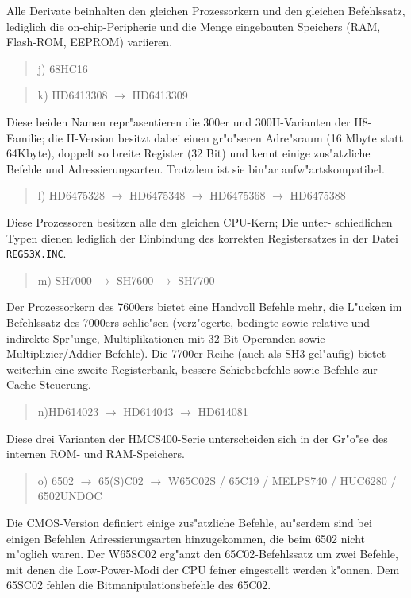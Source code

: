 \documentclass[12pt,a4paper,twoside]{report}
\newcommand{\tty}[1]{{\tt #1}}
\begin{document}
Alle Derivate beinhalten den gleichen Prozessorkern und den
gleichen Befehlssatz, lediglich die on-chip-Peripherie und
die Menge eingebauten Speichers (RAM, Flash-ROM, EEPROM)
variieren.
\begin{quote}
j) 68HC16
\end{quote}
\begin{quote}
k) HD6413308 $\longrightarrow$ HD6413309
\end{quote}
Diese beiden Namen repr"asentieren die 300er und 300H-Varianten der
H8-Familie; die H-Version besitzt dabei einen gr"o"seren Adre"sraum
(16 Mbyte statt 64Kbyte), doppelt so breite Register (32 Bit) und
kennt einige zus"atzliche Befehle und Adressierungsarten.  Trotzdem
ist sie bin"ar aufw"artskompatibel.
\begin{quote}
l) HD6475328 $\longrightarrow$ HD6475348 $\longrightarrow$
   HD6475368 $\longrightarrow$ HD6475388
\end{quote}
Diese Prozessoren besitzen alle den gleichen CPU-Kern; Die unter-
schiedlichen Typen dienen lediglich der Einbindung des korrekten
Registersatzes in der Datei \tty{REG53X.INC}.
\begin{quote}
m) SH7000 $\longrightarrow$ SH7600 $\longrightarrow$ SH7700
\end{quote}
Der Prozessorkern des 7600ers bietet eine Handvoll Befehle mehr, die
L"ucken im Befehlssatz des 7000ers schlie"sen (verz"ogerte, bedingte
sowie relative und indirekte Spr"unge, Multiplikationen mit 32-Bit-Operanden
sowie Multiplizier/Addier-Befehle).  Die 7700er-Reihe (auch als SH3
gel"aufig) bietet weiterhin eine zweite Registerbank, bessere
Schiebebefehle sowie Befehle zur Cache-Steuerung.
\begin{quote}
n)HD614023 $\longrightarrow$ HD614043 $\longrightarrow$ HD614081
\end{quote}
Diese drei Varianten der HMCS400-Serie unterscheiden sich in der
Gr"o"se des internen ROM- und RAM-Speichers.
\begin{quote}
o) 6502 $\rightarrow$ 65(S)C02 $\rightarrow$ W65C02S / 65C19 / MELPS740
/ HUC6280 / 6502UNDOC
\end{quote}
Die CMOS-Version definiert einige zus"atzliche Befehle, au"serdem sind
bei einigen Befehlen Adressierungsarten hinzugekommen, die beim 6502
nicht m"oglich waren.  Der W65SC02 erg"anzt den
65C02-Befehlssatz um zwei Befehle, mit denen die Low-Power-Modi
der CPU feiner eingestellt werden k"onnen.  Dem 65SC02 fehlen die
Bitmanipulationsbefehle des 65C02.
\end{document}
